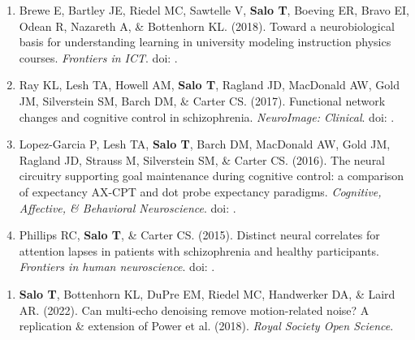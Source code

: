 \documentclass[10pt]{article}
\newcommand{\doi}[1]{doi: \textlink{https://doi.org/#1}{#1}}
\newcommand{\sectionstyle}{\LARGE \fontfamily{lmr}\selectfont}
\newcommand{\textlink}[3][blue]{\href{#2}{\color{#1}{#3}}}
\begin{document}
\begin{enumerate}
	\item Brewe E, Bartley JE, Riedel MC, Sawtelle V, \textbf{Salo T}, Boeving ER, Bravo EI, Odean R, Nazareth A, \& Bottenhorn KL.
	(2018).
	Toward a neurobiological basis for understanding learning in university modeling instruction physics courses.
	\emph{Frontiers in ICT}.
	\doi{10.3389/fict.2018.00010}.

	\item Ray KL, Lesh TA, Howell AM, \textbf{Salo T}, Ragland JD, MacDonald AW, Gold JM, Silverstein SM, Barch DM, \& Carter CS.
	(2017).
	Functional network changes and cognitive control in schizophrenia.
	\emph{NeuroImage: Clinical}.
	\doi{10.1016/j.nicl.2017.05.001}.

	\item Lopez-Garcia P, Lesh TA, \textbf{Salo T}, Barch DM, MacDonald AW, Gold JM, Ragland JD, Strauss M, Silverstein SM, \& Carter CS.
	(2016).
	The neural circuitry supporting goal maintenance during cognitive control: a comparison of expectancy AX-CPT and dot probe expectancy paradigms.
	\emph{Cognitive, Affective, \& Behavioral Neuroscience}.
	\doi{10.3758/s13415-015-0384-1}.

	\item Phillips RC, \textbf{Salo T}, \& Carter CS. (2015).
	Distinct neural correlates for attention lapses in patients with schizophrenia and healthy participants.
	\emph{Frontiers in human neuroscience}.
	\doi{10.3389/fnhum.2015.00502}.

\end{enumerate}

\bigskip

\begin{center}\sectionstyle{ACCEPTED IN PRINCIPLE}\end{center}

\begin{enumerate}

	\item \textbf{Salo T}, Bottenhorn KL, DuPre EM, Riedel MC, Handwerker DA, \& Laird AR.
	(2022).
	Can multi-echo denoising remove motion-related noise? A replication \& extension of Power et al. (2018).
	\emph{Royal Society Open Science}.

\end{enumerate}

\bigskip

\begin{center}\sectionstyle{PREPRINTS}\end{center}
\end{document}
